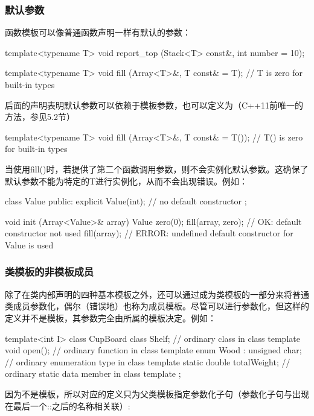 \subsubsection{默认参数}

函数模板可以像普通函数声明一样有默认的参数：

\begin{cpp}
template<typename T>
void report_top (Stack<T> const&, int number = 10);

template<typename T>
void fill (Array<T>&, T const& = T{}); // T{} is zero for built-in types
\end{cpp}

后面的声明表明默认参数可以依赖于模板参数，也可以定义为（C++11前唯一的方法，参见5.2节）

\begin{cpp}
template<typename T>
void fill (Array<T>&, T const& = T()); // T() is zero for built-in types
\end{cpp}

当使用fill()时，若提供了第二个函数调用参数，则不会实例化默认参数。这确保了默认参数不能为特定的T进行实例化，从而不会出现错误。例如：

\begin{cpp}
class Value {
public:
	explicit Value(int); // no default constructor
};

void init (Array<Value>& array) {
	Value zero(0);
	fill(array, zero); // OK: default constructor not used
	fill(array); // ERROR: undefined default constructor for Value is used
}
\end{cpp}

\subsubsection{类模板的非模板成员}

除了在类内部声明的四种基本模板之外，还可以通过成为类模板的一部分来将普通类成员参数化，偶尔（错误地）也称为成员模板。尽管可以进行参数化，但这样的定义并不是模板，其参数完全由所属的模板决定。例如：

\begin{cpp}
template<int I>
class CupBoard {
	class Shelf; // ordinary class in class template
	void open(); // ordinary function in class template
	enum Wood : unsigned char; // ordinary enumeration type in class template
	static double totalWeight; // ordinary static data member in class template
};
\end{cpp}

因为不是模板，所以对应的定义只为父类模板指定参数化子句（参数化子句与出现在最后一个::之后的名称相关联）:

